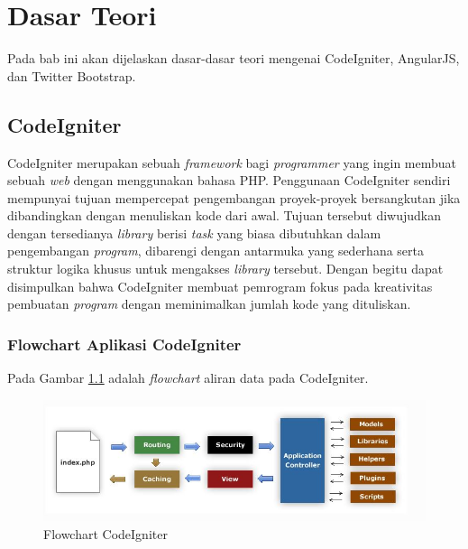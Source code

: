 \chapter{Dasar Teori}
\label{chap: dasarTeori}

Pada bab ini akan dijelaskan dasar-dasar teori mengenai CodeIgniter, AngularJS, dan Twitter Bootstrap.

\section{CodeIgniter}
\label{sec: codeigniter}

CodeIgniter \cite{ciDocs} merupakan sebuah \textit{framework} bagi \textit{programmer} yang ingin membuat sebuah \textit{web} dengan menggunakan bahasa PHP. Penggunaan CodeIgniter sendiri mempunyai tujuan mempercepat pengembangan proyek-proyek bersangkutan jika dibandingkan dengan menuliskan kode dari awal. Tujuan tersebut diwujudkan dengan tersedianya \textit{library} berisi \textit{task} yang biasa dibutuhkan dalam pengembangan \textit{program}, dibarengi dengan antarmuka yang sederhana serta struktur logika khusus untuk mengakses \textit{library} tersebut. Dengan begitu dapat disimpulkan bahwa CodeIgniter membuat pemrogram fokus pada kreativitas pembuatan \textit{program} dengan meminimalkan jumlah kode yang dituliskan.

\subsection{Flowchart Aplikasi CodeIgniter}
\label{sub: FlowAppCI}

Pada Gambar \ref{fig:flowchartCI} adalah \textit{flowchart} aliran data pada CodeIgniter.
\begin{figure}[H]
	\centering
	\includegraphics[scale=0.75]{Gambar/flowChartCI}
	\caption{Flowchart CodeIgniter}
	\label{fig:flowchartCI}
\end{figure}

